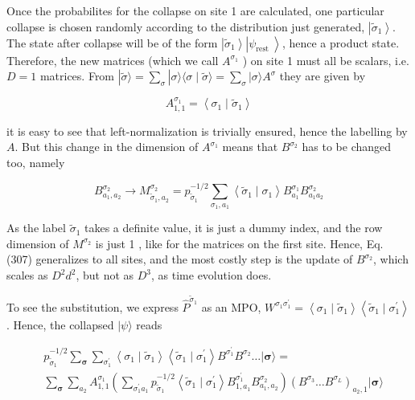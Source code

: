 \documentclass[12pt]{article}
\begin{document}
Once the probabilites for the collapse on site 1 are calculated, one particular collapse is chosen randomly according to the distribution just generated, $\left|\tilde{\sigma}_{1}\right\rangle$. The state after collapse will be of the form $\left|\tilde{\sigma}_{1}\right\rangle\left|\psi_{\text {rest }}\right\rangle$, hence a product state. Therefore, the new matrices (which we call $A^{\sigma_{1}}$ ) on site 1 must all be scalars, i.e. $D=1$ matrices. From $|\tilde{\sigma}\rangle=\sum_{\sigma}|\sigma\rangle\langle\sigma \mid \tilde{\sigma}\rangle=\sum_{\sigma}|\sigma\rangle A^{\sigma}$ they are given by


\begin{equation*}
A_{1,1}^{\sigma_{1}}=\left\langle\sigma_{1} \mid \tilde{\sigma}_{1}\right\rangle \tag{308}
\end{equation*}


it is easy to see that left-normalization is trivially ensured, hence the labelling by $A$. But this change in the dimension of $A^{\sigma_{1}}$ means that $B^{\sigma_{2}}$ has to be changed too, namely


\begin{equation*}
B_{a_{1}, a_{2}}^{\sigma_{2}} \rightarrow M_{\tilde{\sigma}_{1}, a_{2}}^{\sigma_{2}}=p_{\tilde{\sigma}_{1}}^{-1 / 2} \sum_{\sigma_{1}, a_{1}}\left\langle\tilde{\sigma}_{1} \mid \sigma_{1}\right\rangle B_{a_{1}}^{\sigma_{1}} B_{a_{1} a_{2}}^{\sigma_{2}} \tag{309}
\end{equation*}


As the label $\tilde{\sigma}_{1}$ takes a definite value, it is just a dummy index, and the row dimension of $M^{\sigma_{2}}$ is just 1 , like for the matrices on the first site. Hence, Eq. (307) generalizes to all sites, and the most costly step is the update of $B^{\sigma_{2}}$, which scales as $D^{2} d^{2}$, but not as $D^{3}$, as time evolution does.

To see the substitution, we express $\hat{P}^{\tilde{\sigma}_{1}}$ as an MPO, $W^{\sigma_{1} \sigma_{1}^{\prime}}=\left\langle\sigma_{1} \mid \tilde{\sigma}_{1}\right\rangle\left\langle\tilde{\sigma}_{1} \mid \sigma_{1}^{\prime}\right\rangle$. Hence, the collapsed $|\psi\rangle$ reads

$$
\begin{aligned}
& p_{\tilde{\sigma}_{1}}^{-1 / 2} \sum_{\boldsymbol{\sigma}} \sum_{\sigma_{1}^{\prime}}\left\langle\sigma_{1} \mid \tilde{\sigma}_{1}\right\rangle\left\langle\tilde{\sigma}_{1} \mid \sigma_{1}^{\prime}\right\rangle B^{\sigma_{1}^{\prime}} B^{\sigma_{2}} \ldots|\boldsymbol{\sigma}\rangle= \\
& \sum_{\boldsymbol{\sigma}} \sum_{a_{2}} A_{1,1}^{\sigma_{1}}\left(\sum_{\sigma_{1}^{\prime} a_{1}} p_{\tilde{\sigma}_{1}}^{-1 / 2}\left\langle\tilde{\sigma}_{1} \mid \sigma_{1}^{\prime}\right\rangle B_{1, a_{1}}^{\sigma_{1}^{\prime}} B_{a_{1}, a_{2}}^{\sigma_{2}}\right)\left(B^{\sigma_{3}} \ldots B^{\sigma_{L}}\right)_{a_{2}, 1}|\boldsymbol{\sigma}\rangle
\end{aligned}
$$
\end{document}
